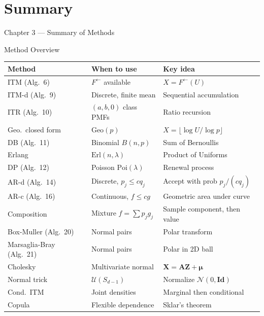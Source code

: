 \documentclass[aspectratio=169,10pt]{beamer}
\newcommand{\UU}{\mathcal{U}}
\newcommand{\NN}{\mathcal{N}}
\begin{document}
\section{Summary}

\begin{frame}[allowframebreaks]{Chapter 3 --- Summary of Methods}
  \begin{block}{Method Overview}
    \begin{tabular}{@{}lll@{}}
      \toprule
      Method & When to use & Key idea \\
      \midrule
      ITM (Alg.\ 6) & $F^{\leftarrow}$ available & $X = F^{\leftarrow}(U)$ \\
      ITM-d (Alg.\ 9) & Discrete, finite mean & Sequential accumulation \\
      ITR (Alg.\ 10) & $(a,b,0)$ class PMFs & Ratio recursion \\
      Geo.\ closed form & $\mathrm{Geo}(p)$ & $X=\lfloor\log U/\log p\rfloor$ \\
      DB (Alg.\ 11) & Binomial $B(n,p)$ & Sum of Bernoullis \\
      Erlang & $\mathrm{Erl}(n,\lambda)$ & Product of Uniforms \\
      DP (Alg.\ 12) & Poisson $\mathrm{Poi}(\lambda)$ & Renewal process \\
      AR-d (Alg.\ 14) & Discrete, $p_j\le cq_j$ & Accept with prob $p_j/(cq_j)$ \\
      AR-c (Alg.\ 16) & Continuous, $f\le cg$ & Geometric area under curve \\
      Composition & Mixture $f=\sum p_j g_j$ & Sample component, then value \\
      Box-Muller (Alg.\ 20) & Normal pairs & Polar transform \\
      Marsaglia-Bray (Alg.\ 21) & Normal pairs & Polar in 2D ball \\
      Cholesky & Multivariate normal & $\mathbf{X}=\mathbf{A}\mathbf{Z}+\boldsymbol{\mu}$ \\
      Normal trick & $\UU(S_{d-1})$ & Normalize $\NN(0,\mathbf{Id})$ \\
      Cond.\ ITM & Joint densities & Marginal then conditional \\
      Copula & Flexible dependence & Sklar's theorem \\
      \bottomrule
    \end{tabular}
  \end{block}


\end{frame}
\end{document}
